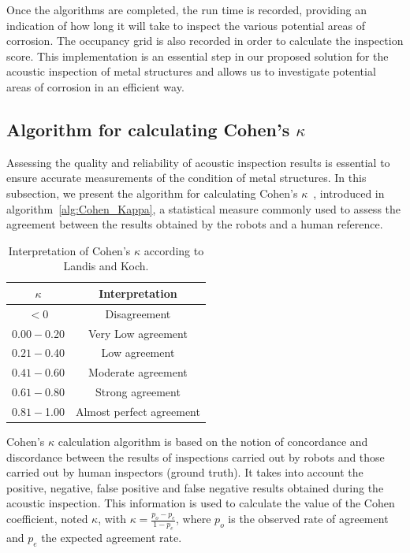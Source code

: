 \documentclass[english,RandD]{rapportPFE}  %
\begin{document}
			Once the algorithms are completed, the run time is recorded, providing an indication of how long it will take to inspect the various potential areas of corrosion.
			The occupancy grid is also recorded in order to calculate the inspection score.
			This implementation is an essential step in our proposed solution for the acoustic inspection of metal structures and allows us to investigate potential areas of corrosion in an efficient way.
		\subsection*{Algorithm for calculating Cohen's $\kappa$}
			Assessing the quality and reliability of acoustic inspection results is essential to ensure accurate measurements of the condition of metal structures.
			In this subsection, we present the algorithm for calculating Cohen's $\kappa$~\cite{enwiki:1130024730}, introduced in algorithm~\ref{alg:Cohen_Kappa}, a statistical measure commonly used to assess the agreement between the results obtained by the robots and a human reference.

			\begin{table}[h!]
				\centering
				\begin{tabular}{|c|c|}
					\hline
					$\kappa$ & Interpretation \\
					\hline
					$< 0$ & Disagreement \\
					\hline
					$0.00 - $0.20 & Very Low agreement \\
					\hline
					$0.21 - $0.40 & Low agreement \\
					\hline
					$0.41 - $0.60 & Moderate agreement \\
					\hline
					$0.61 - $0.80 & Strong agreement \\
					\hline
					$0.81 - $1.00 & Almost perfect agreement \\
					\hline
				\end{tabular}
				\caption{Interpretation of Cohen's $\kappa$ according to Landis and Koch.}
				\label{tab:Kappa_Cohen}
			\end{table}

			Cohen's $\kappa$ calculation algorithm is based on the notion of concordance and discordance between the results of inspections carried out by robots and those carried out by human inspectors (ground truth).
			It takes into account the positive, negative, false positive and false negative results obtained during the acoustic inspection.
			This information is used to calculate the value of the Cohen coefficient, noted $\kappa$, with $\kappa = \frac{p_o - p_e}{1 - p_e}$, where $p_o$ is the observed rate of agreement and $p_e$ the expected agreement rate.
\end{document}
